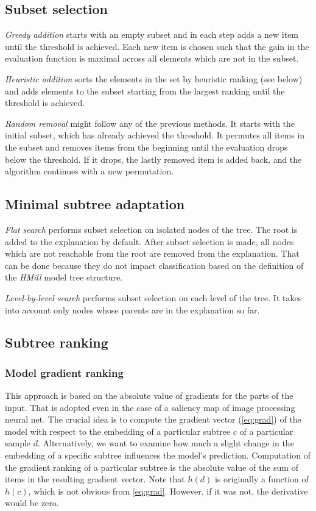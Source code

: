 \subsection{Subset selection}
\emph{Greedy addition} starts with an empty subset and in each step adds a new item until the threshold is achieved. Each new item is chosen such that the gain in the evaluation function is maximal across all elements which are not in the subset.

\emph{Heuristic addition} sorts the elements in the set by heuristic ranking (see below) and adds elements to the subset starting from the largest ranking until the threshold is achieved.

\emph{Random removal} might follow any of the previous methods. It starts with the initial subset, which has already achieved the threshold. It permutes all items in the subset and removes items from the beginning until the evaluation drops below the threshold. If it drops, the lastly removed item is added back, and the algorithm continues with a new permutation.
\subsection{Minimal subtree adaptation}
\emph{Flat search} performs subset selection on isolated nodes of the tree. The root is added to the explanation by default. After subset selection is made, all nodes which are not reachable from the root are removed from the explanation. That can be done because they do not impact classification based on the definition of the \emph{HMill} model tree structure.

\emph{Level-by-level search} performs subset selection on each level of the tree. It takes into account only nodes whose parents are in the explanation so far.

\subsection{Subtree ranking}
\subsubsection{Model gradient ranking}
This approach is based on the absolute value of gradients for the parts of the input. That is adopted even in the case of a saliency map of image processing neural net. The crucial idea is to compute the gradient vector (\eqref{eq:grad}) of the model with respect to the embedding of a particular subtree $c$ of a particular sample $d$. Alternatively, we want to examine how much a slight change in the embedding of a specific subtree influences the model's prediction. Computation of the gradient ranking of a particular subtree is the absolute value of the sum of items in the resulting gradient vector. Note that $h(d)$ is originally a function of $h(c)$, which is not obvious from \eqref{eq:grad}. However, if it was not, the derivative would be zero.

